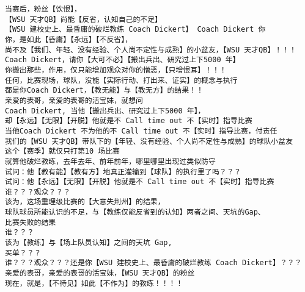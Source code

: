 \documentclass[9pt, b5paper]{article}
\begin{document}
\begin{verbatim}
当赛后，粉丝【饮恨】，
【WSU 天才QB】尚能【反省，认知自己的不足】
【WSU 建校史上、最昏庸的破烂教练 Coach Dickert】 Coach Dickert 你
你，是如此【昏庸】【永远】【不反省】，
尚不及【我们、年轻、没有经验、个人尚不定性与成熟】的小盆友，【WSU 天才QB】！！！
Coach Dickert，请你【大可不必】【搬出兵出、研究过上下5000 年】
你搬出那些，作用，仅只能增加观众对你的憎恶，【只增恨耳】！！！
任何，比赛现场，球队，没能【实际行动、打出来、证实】的概念与执行
都是你Coach Dickert，【教无能】与【教无方】的结果！！
亲爱的表哥，亲爱的表哥的活宝妹，就想问
Coach Dickert, 当他【搬出兵出、研究过上下5000 年】，
却【永远】【无限】【开脱】他就是不 Call time out 不【实时】指导比赛
当他Coach Dickert 不为他的不 Call time out 不【实时】指导比赛，付责任
我们的【WSU 天才QB】带队下的【年轻、没有经验、个人尚不定性与成熟】的球队小盆友
这个【赛季】就仅只打第10 场比赛
就算他破烂教练，去年去年、前年前年，哪里哪里出现过类似防守
试问：他【教有能】【教有方】地真正灌输到【球队】的执行里了吗？？？
试问：他【永远】【无限】【开脱】他就是不 Call time out 不【实时】指导比赛
谁？？？观众？？？
该为，这场重理级比赛的【大意失荆州】的结果，
球队球员所能认识的不足，与【教练仅能反省到的认知】两者之间、天坑的Gap、
比赛失败的结果
谁？？？
该为【教练】与【场上队员认知】之间的天坑 Gap,
买单？？？
谁？？？观众？？？还是你【WSU 建校史上、最昏庸的破烂教练 Coach Dickert】？？？
亲爱的表哥，亲爱的表哥的活宝妹，【WSU 天才QB】的粉丝
现在，就是，【不待见】如此【不作为】的教练！！！！


\end{verbatim}
\end{document}
